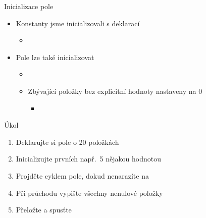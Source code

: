 \begin{frame}{Inicializace pole}

  \begin{itemize}
    \item Konstanty jsme inicializovali s deklarací
    \begin{itemize}
      \item {}
    \end{itemize}

    \pause

    \item Pole lze také inicializovat
    \begin{itemize}
      \item {}

      \pause

      \item Zbývající položky bez explicitní hodnoty nastaveny na 0
      \begin{itemize}
	\item {}
      \end{itemize}
    \end{itemize}

  \end{itemize}

\end{frame}

\begin{frame}{Úkol}

  \begin{enumerate}
    \item Deklarujte si pole o 20 položkách
    \item Inicializujte prvních např.\ 5 nějakou hodnotou
    \item Projděte cyklem pole, dokud nenarazíte na 
    \item Při průchodu vypište všechny nenulové položky
    \item Přeložte a spusťte
  \end{enumerate}

\end{frame}


